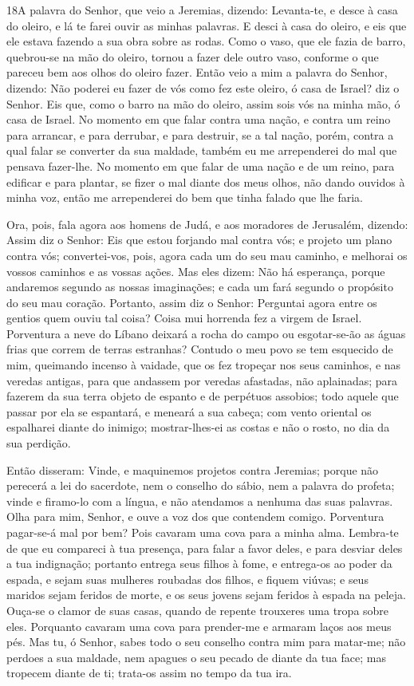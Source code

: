 \lettrine{18} A palavra do Senhor, que veio a Jeremias,
dizendo: Levanta-te, e desce à casa do oleiro, e lá te farei
ouvir as minhas palavras. E desci à casa do oleiro, e eis que
ele estava fazendo a sua obra sobre as rodas. Como o vaso, que
ele fazia de barro, quebrou-se na mão do oleiro, tornou a fazer dele
outro vaso, conforme o que pareceu bem aos olhos do oleiro fazer.
Então veio a mim a palavra do Senhor, dizendo: Não poderei
eu fazer de vós como fez este oleiro, ó casa de Israel? diz o
Senhor. Eis que, como o barro na mão do oleiro, assim sois vós na
minha mão, ó casa de Israel. No momento em que falar contra uma
nação, e contra um reino para arrancar, e para derrubar, e para
destruir, se a tal nação, porém, contra a qual falar se
converter da sua maldade, também eu me arrependerei do mal que
pensava fazer-lhe. No momento em que falar de uma nação e de um
reino, para edificar e para plantar, se fizer o mal diante
dos meus olhos, não dando ouvidos à minha voz, então me arrependerei
do bem que tinha falado que lhe faria.

Ora, pois, fala agora aos homens de Judá, e aos moradores de
Jerusalém, dizendo: Assim diz o Senhor: Eis que estou forjando mal
contra vós; e projeto um plano contra vós; convertei-vos, pois,
agora cada um do seu mau caminho, e melhorai os vossos caminhos e as
vossas ações. Mas eles dizem: Não há esperança, porque
andaremos segundo as nossas imaginações; e cada um fará segundo o
propósito do seu mau coração. Portanto, assim diz o Senhor:
Perguntai agora entre os gentios quem ouviu tal coisa? Coisa mui
horrenda fez a virgem de Israel. Porventura a neve do Líbano
deixará a rocha do campo ou esgotar-se-ão as águas frias que correm
de terras estranhas? Contudo o meu povo se tem esquecido de
mim, queimando incenso à vaidade, que os fez tropeçar nos seus
caminhos, e nas veredas antigas, para que andassem por veredas
afastadas, não aplainadas; para fazerem da sua terra objeto
de espanto e de perpétuos assobios; todo aquele que passar por ela
se espantará, e meneará a sua cabeça; com vento oriental os
espalharei diante do inimigo; mostrar-lhes-ei as costas e não o
rosto, no dia da sua perdição.

Então disseram: Vinde, e maquinemos projetos contra Jeremias;
porque não perecerá a lei do sacerdote, nem o conselho do sábio, nem
a palavra do profeta; vinde e firamo-lo com a língua, e não
atendamos a nenhuma das suas palavras. Olha para mim, Senhor,
e ouve a voz dos que contendem comigo. Porventura pagar-se-á
mal por bem? Pois cavaram uma cova para a minha alma. Lembra-te de
que eu compareci à tua presença, para falar a favor deles, e para
desviar deles a tua indignação; portanto entrega seus filhos
à fome, e entrega-os ao poder da espada, e sejam suas mulheres
roubadas dos filhos, e fiquem viúvas; e seus maridos sejam feridos
de morte, e os seus jovens sejam feridos à espada na peleja.
Ouça-se o clamor de suas casas, quando de repente trouxeres
uma tropa sobre eles. Porquanto cavaram uma cova para prender-me e
armaram laços aos meus pés. Mas tu, ó Senhor, sabes todo o
seu conselho contra mim para matar-me; não perdoes a sua maldade,
nem apagues o seu pecado de diante da tua face; mas tropecem diante
de ti; trata-os assim no tempo da tua ira.

